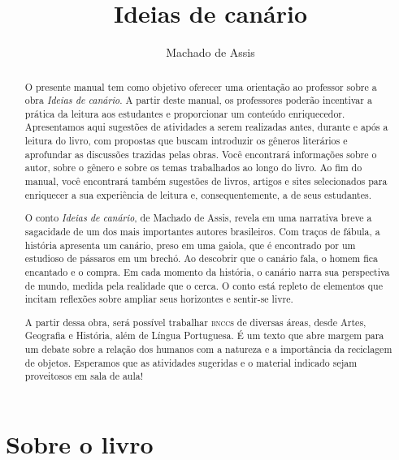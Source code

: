 \documentclass[11pt]{extarticle}
\newcommand{\AutorLivro}{Machado de Assis}
\newcommand{\TituloLivro}{Ideias de canário}
\newcommand{\colaborador}{Ana Lancman}
\begin{document}
\title{\TituloLivro}
\author{\AutorLivro}
\def\authornotes{\colaborador}

\date{}
\maketitle


\tableofcontents


\begin{abstract}

O presente manual tem como objetivo oferecer uma orientação ao professor sobre a obra \textit{Ideias de canário}. A partir deste manual, os professores poderão incentivar a prática da leitura aos estudantes e proporcionar um conteúdo enriquecedor. Apresentamos aqui sugestões de atividades a serem realizadas antes, durante e após a leitura do livro, com propostas que buscam introduzir os gêneros literários e aprofundar as discussões trazidas pelas obras. Você encontrará informações sobre o autor, sobre o gênero e sobre os temas trabalhados ao longo do livro. Ao fim do manual, você encontrará também sugestões de livros, artigos e sites selecionados para enriquecer a sua experiência de leitura e, consequentemente, a de seus estudantes.

O conto \textit{Ideias de canário}, de Machado de Assis, revela em uma narrativa breve a sagacidade de um dos mais importantes autores brasileiros. Com traços de fábula, a história apresenta um canário, preso em uma gaiola, que é encontrado por um estudioso de pássaros em um brechó. Ao descobrir que o canário fala, o homem fica encantado e o compra. Em cada momento da história, o canário narra sua perspectiva de mundo, medida pela realidade que o cerca. O conto está repleto de elementos que incitam reflexões sobre ampliar seus horizontes e sentir-se livre.

A partir dessa obra, será possível trabalhar \textsc{bncc}s de diversas áreas, desde Artes, Geografia e História, além de Língua Portuguesa. É um texto que abre margem para um debate sobre a relação dos humanos com a natureza e a importância da reciclagem de objetos. Esperamos que as atividades sugeridas e o material indicado sejam proveitosos em sala de aula!

\end{abstract}

\section{Sobre o livro}
\end{document}
